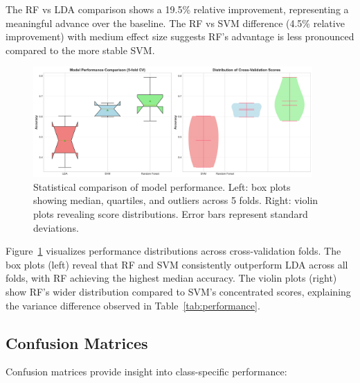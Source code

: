 \documentclass[11pt]{article}
\begin{document}
The RF vs LDA comparison shows a 19.5\% relative improvement, representing a meaningful advance over the baseline. The RF vs SVM difference (4.5\% relative improvement) with medium effect size suggests RF's advantage is less pronounced compared to the more stable SVM.

\begin{figure}[H]
    \centering
    \includegraphics[width=0.95\textwidth]{../results/figures/04_comprehensive_statistical_comparison.png}
    \caption{Statistical comparison of model performance. Left: box plots showing median, quartiles, and outliers across 5 folds. Right: violin plots revealing score distributions. Error bars represent standard deviations.}
    \label{fig:statistical_comparison}
\end{figure}

Figure~\ref{fig:statistical_comparison} visualizes performance distributions across cross-validation folds. The box plots (left) reveal that RF and SVM consistently outperform LDA across all folds, with RF achieving the highest median accuracy. The violin plots (right) show RF's wider distribution compared to SVM's concentrated scores, explaining the variance difference observed in Table~\ref{tab:performance}.

\subsection{Confusion Matrices}

Confusion matrices provide insight into class-specific performance:
\end{document}
